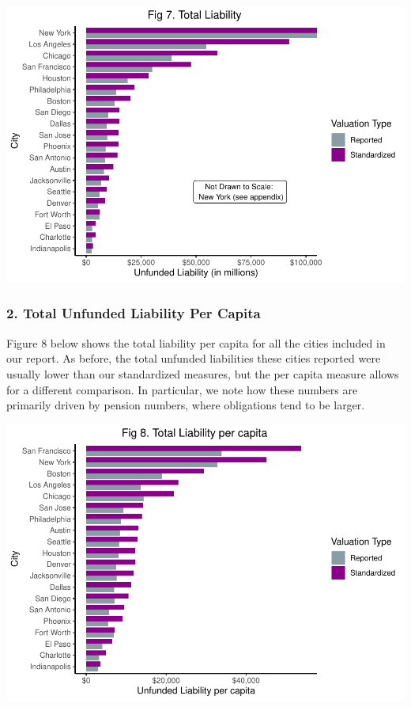 \documentclass[
]{article}
\begin{document}
\includegraphics{City-Solvency-Report--Adjusted-_files/figure-latex/unnamed-chunk-12-1.pdf}

\hypertarget{total-unfunded-liability-per-capita}{%
\subsubsection{2. Total Unfunded Liability Per
Capita}\label{total-unfunded-liability-per-capita}}

Figure 8 below shows the total liability per capita for all the cities
included in our report. As before, the total unfunded liabilities these
cities reported were usually lower than our standardized measures, but
the per capita measure allows for a different comparison. In particular,
we note how these numbers are primarily driven by pension numbers, where
obligations tend to be larger.

\includegraphics{City-Solvency-Report--Adjusted-_files/figure-latex/unnamed-chunk-13-1.pdf}
\end{document}
